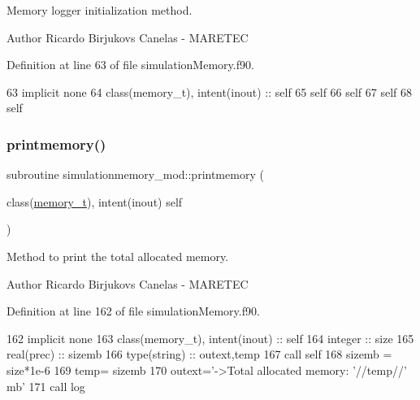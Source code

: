 Memory logger initialization method. 

\begin{DoxyAuthor}{Author}
Ricardo Birjukovs Canelas -\/ M\+A\+R\+E\+T\+EC 
\end{DoxyAuthor}


Definition at line 63 of file simulation\+Memory.\+f90.


\begin{DoxyCode}
63     \textcolor{keywordtype}{implicit none}
64     \textcolor{keywordtype}{class}(memory\_t), \textcolor{keywordtype}{intent(inout)} :: self
65     self%
66     self%
67     self%
68     self%
\end{DoxyCode}
\mbox{\label{namespacesimulationmemory__mod_a5b7c22d236e24b59599f705f63ba3c09}} 
\subsubsection{\texorpdfstring{printmemory()}{printmemory()}}
{\footnotesize\ttfamily subroutine simulationmemory\+\_\+mod\+::printmemory (\begin{DoxyParamCaption}\item[{class(\mbox{\hyperlink{structsimulationmemory__mod_1_1memory__t}{memory\+\_\+t}}), intent(inout)}]{self }\end{DoxyParamCaption})\hspace{0.3cm}{\ttfamily [private]}}



Method to print the total allocated memory. 

\begin{DoxyAuthor}{Author}
Ricardo Birjukovs Canelas -\/ M\+A\+R\+E\+T\+EC 
\end{DoxyAuthor}


Definition at line 162 of file simulation\+Memory.\+f90.


\begin{DoxyCode}
162     \textcolor{keywordtype}{implicit none}
163     \textcolor{keywordtype}{class}(memory\_t), \textcolor{keywordtype}{intent(inout)} :: self
164     \textcolor{keywordtype}{integer} :: size
165     \textcolor{keywordtype}{real(prec)} :: sizemb
166     \textcolor{keywordtype}{type}(string) :: outext,temp
167     \textcolor{keyword}{call }self%
168     sizemb = size*1e-6
169     temp= sizemb
170     outext=\textcolor{stringliteral}{'->Total allocated memory: '}//temp//\textcolor{stringliteral}{' mb'}
171     \textcolor{keyword}{call }log%
\end{DoxyCode}
\mbox{\label{namespacesimulationmemory__mod_a9e12442b1b7b5d105cd70686e04106d3}} 
